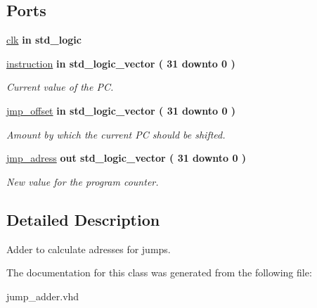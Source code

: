 \subsection*{\-Ports}
 \begin{DoxyCompactItemize}
\item 
\hypertarget{classjump__adder_af860a3a86b5cfd289a189d1220f4648d}{\hyperlink{classjump__adder_af860a3a86b5cfd289a189d1220f4648d}{clk}  {\bfseries {\bfseries in }} {\bfseries std\-\_\-logic } }\label{classjump__adder_af860a3a86b5cfd289a189d1220f4648d}

\item 
\hypertarget{classjump__adder_a298266092b29f7f7afb088eecb4e46c1}{\hyperlink{classjump__adder_a298266092b29f7f7afb088eecb4e46c1}{instruction}  {\bfseries {\bfseries in }} {\bfseries std\-\_\-logic\-\_\-vector (   31    downto    0  ) } }\label{classjump__adder_a298266092b29f7f7afb088eecb4e46c1}

\begin{DoxyCompactList}\small\item\em \-Current value of the \-P\-C. \end{DoxyCompactList}\item 
\hypertarget{classjump__adder_a83702b6a2e8dc32a0ac5cfe7e8cafd61}{\hyperlink{classjump__adder_a83702b6a2e8dc32a0ac5cfe7e8cafd61}{jmp\-\_\-offset}  {\bfseries {\bfseries in }} {\bfseries std\-\_\-logic\-\_\-vector (   31    downto    0  ) } }\label{classjump__adder_a83702b6a2e8dc32a0ac5cfe7e8cafd61}

\begin{DoxyCompactList}\small\item\em \-Amount by which the current \-P\-C should be shifted. \end{DoxyCompactList}\item 
\hypertarget{classjump__adder_ad176de343f2a06617f92deabbbbf6256}{\hyperlink{classjump__adder_ad176de343f2a06617f92deabbbbf6256}{jmp\-\_\-adress}  {\bfseries {\bfseries out }} {\bfseries std\-\_\-logic\-\_\-vector (   31    downto    0  ) } }\label{classjump__adder_ad176de343f2a06617f92deabbbbf6256}

\begin{DoxyCompactList}\small\item\em \-New value for the program counter. \end{DoxyCompactList}\end{DoxyCompactItemize}


\subsection{\-Detailed \-Description}
\-Adder to calculate adresses for jumps. 

\-The documentation for this class was generated from the following file\-:\begin{DoxyCompactItemize}
\item 
jump\-\_\-adder.\-vhd\end{DoxyCompactItemize}
